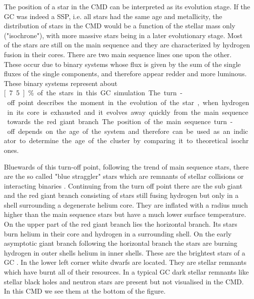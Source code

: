The position of a star in the \ac{CMD} can be interpreted as its evolution stage. If the \ac{GC} was indeed a \ac{SSP}, i.e. all stars had the same age and metallicity, the distribution of stars in the \ac{CMD} would be a function of the stellar mass only ("isochrone"), with more massive stars being in a later evolutionary stage. Most of the stars are still on the main sequence and they are characterized by hydrogen fusion in their cores. There are two main sequence lines one upon the other. These occur due to binary systems whose flux is given by the sum of the single fluxes of the single components, and therefore appear redder and more luminous. These binary systems represent about \unit[7.5]{\%} of the stars in this \ac{GC} simulation. The turn-off point describes the moment in the evolution of the star, when hydrogen in its core is exhausted and it evolves away quickly from the main sequence towards the red giant branch. The position of the main sequence turn-off depends on the age of the system and therefore can be used as an indicator to determine the age of the cluster by comparing it to theoretical isochrones.  
\par Bluewards of this turn-off point, following the trend of main sequence stars, there are the so called "blue straggler" stars which are remnants of stellar collisions or interacting binaries \citep[p.628]{2008gady.book.....B}. Continuing from the turn off point there are the sub giant and the red giant branch consisting of stars still fusing hydrogen but only in a shell surrounding a degenerate helium core. They are inflated with a radius much higher than the main sequence stars but have a much lower surface temperature. On the upper part of the red giant branch lies the horizontal branch. Its stars burn helium in their core and hydrogen in a surrounding shell. On the early asymptotic giant branch following the horizontal branch the stars are burning hydrogen in outer shells helium in inner shells. These are the brightest stars of a \ac{GC} \citep[p.476-477]{2006ima..book.....C}. In the lower left corner white dwarfs are located. They are stellar remnants which have burnt all of their resources. In a typical \ac{GC} dark stellar remnants like stellar black holes and neutron stars are present but not visualised in the \ac{CMD}. In this \ac{CMD} we see them at the bottom of the figure. 
